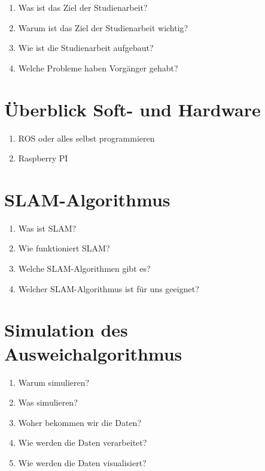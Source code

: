 \documentclass[12pt]{article}
\begin{document}
\begin{enumerate}
    \item Was ist das Ziel der Studienarbeit?\\
    \item Warum ist das Ziel der Studienarbeit wichtig?\\
    \item Wie ist die Studienarbeit aufgebaut?\\
    \item Welche Probleme haben Vorgänger gehabt?\\

\end{enumerate}

\section{Überblick Soft- und Hardware}


\begin{enumerate}
    \item ROS oder alles selbst programmieren
    \item Raspberry PI\\
\end{enumerate}

\section{SLAM-Algorithmus}

\begin{enumerate}
    \item Was ist SLAM?\\
    \item Wie funktioniert SLAM?\\
    \item Welche SLAM-Algorithmen gibt es?\\
    \item Welcher SLAM-Algorithmus ist für uns geeignet?\\

\end{enumerate}
\section{Simulation des Ausweichalgorithmus}

\begin{enumerate}
    \item Warum simulieren?\\
    \item Was simulieren?\\
    \item Woher bekommen wir die Daten?\\
    \item Wie werden die Daten verarbeitet?\\
    \item Wie werden die Daten visualisiert?\\
\end{enumerate}
\end{document}
